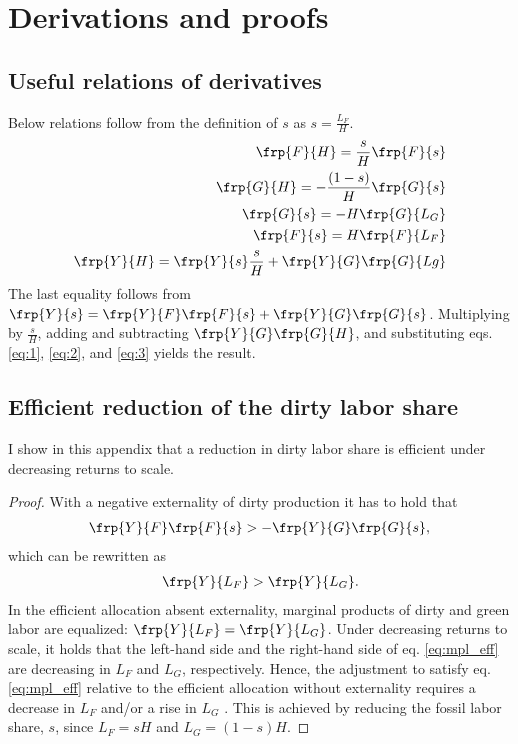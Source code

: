 
\section{Derivations and proofs}\label{app:derivations}

\subsection{Useful relations of derivatives}\label{app:dervs_use}
Below relations follow from the definition of $s$ as $s=\frac{L_F}{H}$.
\begin{align}
\frp{F}{H}=\frac{s}{H}\frp{F}{s}\label{eq:1}\\
\frp{G}{H}=-\frac{(1-s)}{H}\frp{G}{s}\label{eq:2}\\
\frp{G}{s}=-H\frp{G}{L_G}\label{eq:3}\\
\frp{F}{s}=H\frp{F}{L_F}\nonumber\\
\frp{Y}{H}= \frp{Y}{s}\frac{s}{H}+\frp{Y}{G}\frp{G}{Lg}\nonumber
\end{align}
The last equality follows from $\frp{Y}{s}=\frp{Y}{F}\frp{F}{s}+\frp{Y}{G}\frp{G}{s}$. Multiplying by $\frac{s}{H}$, adding and subtracting $\frp{Y}{G}\frp{G}{H}$, and substituting eqs. \eqref{eq:1}, \eqref{eq:2}, and \eqref{eq:3} yields the result. 
\subsection{Efficient reduction of the dirty labor share}\label{app:redeffs}
I show in this appendix that a reduction in dirty labor share is efficient under decreasing returns to scale.
\begin{proof}
	With a negative externality of dirty production it has to hold that 
	\begin{align*}
	\frp{Y}{F}\frp{F}{s}>-\frp{Y}{G}\frp{G}{s},
	\end{align*}
	which can be rewritten as 
	\begin{align}\label{eq:mpl_eff}
	\frp{Y}{L_F}>\frp{Y}{L_G}. 
	\end{align}
	In the efficient allocation absent externality, marginal products of dirty and green labor are equalized: $\frp{Y}{L_F}=\frp{Y}{L_G}$. 
	Under decreasing returns to scale, it holds that the left-hand side and the right-hand side of eq. \eqref{eq:mpl_eff} are decreasing in $L_F$ and $L_G$, respectively. Hence, the adjustment to satisfy eq. \eqref{eq:mpl_eff} relative to the efficient allocation without externality requires a decrease in $L_F$ and/or a rise in $L_G$  .
	This is achieved by reducing the fossil labor share, $s$, since $L_F=sH$ and $L_G=(1-s)H$.	
\end{proof}


